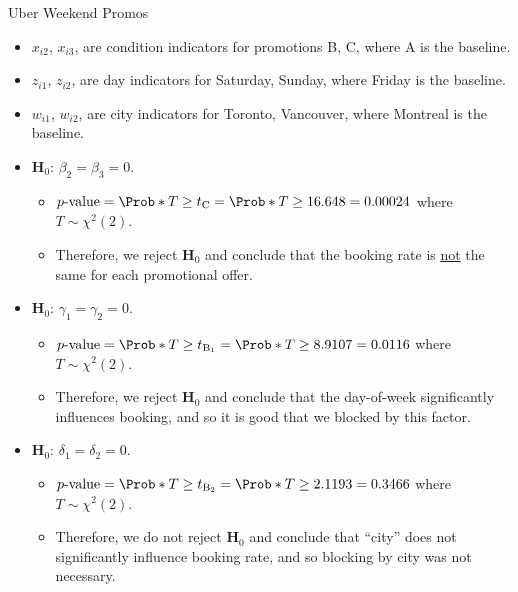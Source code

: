\begin{Example}{Uber Weekend Promos}{}
    \begin{itemize}
        \item $ x_{i2} $, $ x_{i3} $, are condition indicators for promotions B, C, where A is the baseline.
        \item $ z_{i1} $, $ z_{i2} $, are day indicators for Saturday, Sunday, where Friday is the baseline.
        \item $ w_{i1} $, $ w_{i2} $, are city indicators for Toronto, Vancouver, where Montreal is the baseline.
    \end{itemize}
    \begin{itemize}
        \item $ \mathbf{H}_0 $: $ \beta_2=\beta_3=0 $.
              \begin{itemize}
                  \item $ p\text{-value}=\Prob*{T\ge t_\text{C}}=\Prob*{T\ge 16.648}=0.00024 $ where $ T \sim \chi^2(2) $.
                  \item Therefore, we reject $ \mathbf{H}_0 $ and conclude that the booking rate is \underline{not} the same
                        for each promotional offer.
              \end{itemize}
        \item $ \mathbf{H}_0 $: $ \gamma_1=\gamma_2=0 $.
              \begin{itemize}
                  \item $ p\text{-value}=\Prob*{T\ge t_{\text{B}_1}}=\Prob*{T\ge 8.9107}=0.0116 $ where $ T \sim \chi^2(2) $.
                  \item Therefore, we reject $ \mathbf{H}_0 $ and conclude that the day-of-week significantly influences booking, and so it is good that we blocked by this factor.
              \end{itemize}
        \item $ \mathbf{H}_0 $: $ \delta_1=\delta_2=0 $.
              \begin{itemize}
                  \item $ p\text{-value}=\Prob*{T\ge t_{\text{B}_2}}=\Prob*{T\ge 2.1193}=0.3466 $ where $ T \sim \chi^2(2) $.
                  \item Therefore, we do not reject $ \mathbf{H}_0 $ and conclude that ``city'' does not significantly influence booking rate, and so blocking by city was not necessary.
              \end{itemize}
    \end{itemize}

\end{Example}
